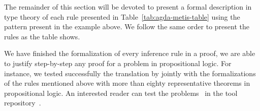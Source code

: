 \documentclass[../main.tex]{subfiles}
\begin{document}
The remainder of this section will be devoted to present a formal
description in type theory of each rule presented in
Table~\ref{tab:agda-metis-table} using the pattern present in the
example above.  We follow the same order to present the rules as the
table shows.











We have finished the formalization of every inference rule in
a \Metis proof, we are able to justify step-by-step any proof
for a problem in propositional logic.
For instance, we tested successfully the translation by \Athena jointly with
the \Agda formalizations of the rules mentioned above with more than eighty
representative theorems in propositional logic. An interested reader can test
the problems~\cite{Prieto-Cubides2017} in the \Athena tool
repository~\cite{Athena}.
\end{document}
